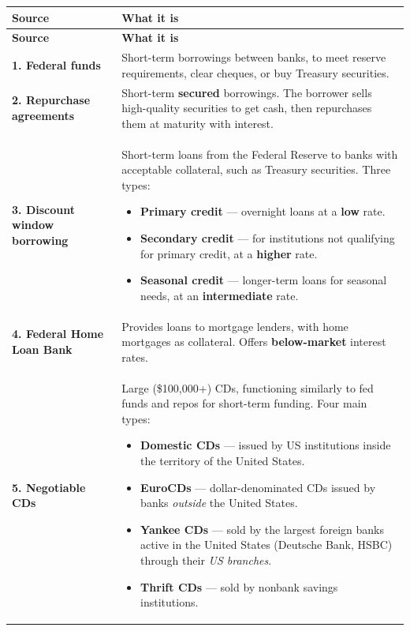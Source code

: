 \begin{center}
\scriptsize
\begin{longtable}{@{}p{3.5cm} p{10.6cm}@{}}
\toprule
\rowcolor{FRMSoft}\textbf{Source} & \textbf{What it is} \\
\midrule
\endfirsthead
\toprule
\rowcolor{FRMSoft}\textbf{Source} & \textbf{What it is} \\
\midrule
\endhead
\textbf{1. Federal funds} &
Short-term borrowings between banks, to meet reserve requirements, clear cheques, or buy Treasury securities. \\
\addlinespace
\textbf{2. Repurchase agreements} &
Short-term \textbf{secured} borrowings. The borrower sells high-quality securities to get cash, then repurchases them at maturity with interest. \\
\addlinespace
\textbf{3. Discount window borrowing} &
Short-term loans from the Federal Reserve to banks with acceptable collateral, such as Treasury securities. Three types:
\begin{itemize}
\item \textbf{Primary credit} --- overnight loans at a \textbf{low} rate.
\item \textbf{Secondary credit} --- for institutions not qualifying for primary credit, at a \textbf{higher} rate.
\item \textbf{Seasonal credit} --- longer-term loans for seasonal needs, at an \textbf{intermediate} rate.
\end{itemize} \\
\addlinespace
\textbf{4. Federal Home Loan Bank} &
Provides loans to mortgage lenders, with home mortgages as collateral. Offers \textbf{below-market} interest rates. \\
\addlinespace
\textbf{5. Negotiable CDs} &
Large (\$100,000+) CDs, functioning similarly to fed funds and repos for short-term funding. Four main types:
\begin{itemize}
\item \textbf{Domestic CDs} --- issued by US institutions inside the territory of the United States.
\item \textbf{EuroCDs} --- dollar-denominated CDs issued by banks \emph{outside} the United States.
\item \textbf{Yankee CDs} --- sold by the largest foreign banks active in the United States (Deutsche Bank, HSBC) through their \emph{US branches}.
\item \textbf{Thrift CDs} --- sold by nonbank savings institutions.
\end{itemize} \\

\end{longtable}
\end{center}
